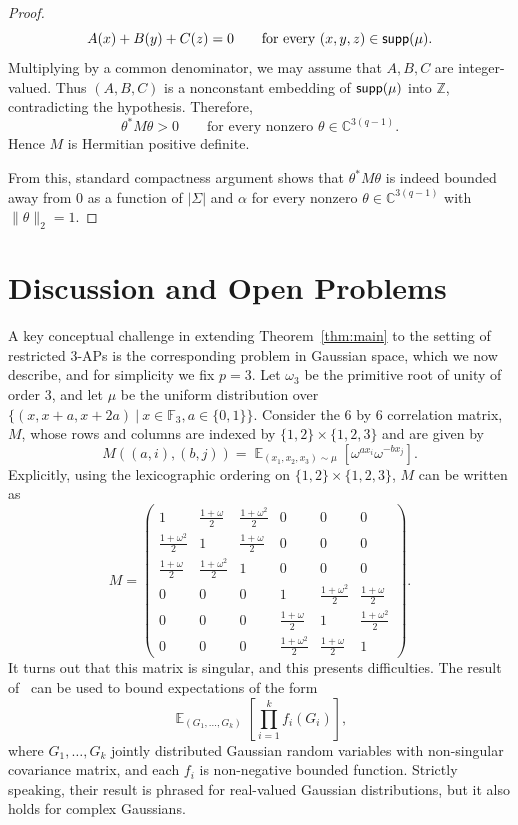 \documentclass[11pt]{article}
\newcommand\norm[1]{\| #1 \|}
\newcommand\Expect[2]{{\mathop{\mathbb{E}}_{#1}\left[ {#2} \right]}}
\begin{document}
\begin{proof}
\[ A(x)+B(y)+C(z)=0 \qquad \text{for every }(x,y,z)\in {\sf supp}(\mu). \]
Multiplying by a common denominator, we may assume that $A,B,C$ are integer-valued. Thus $(A, B, C)$ is a nonconstant embedding of ${\sf supp}(\mu)$ into $\mathbb{Z}$, contradicting the hypothesis. Therefore, \[ \theta^*M\theta>0 \qquad \text{for every nonzero } \theta\in\mathbb{C}^{3(q-1)}. \] Hence $M$ is Hermitian positive definite.

From this, standard compactness argument shows that $\theta^*M\theta$ is indeed bounded away from $0$ as a function of $|\Sigma|$ and $\alpha$ for every nonzero $\theta\in\mathbb{C}^{3(q-1)}$ with $\norm{\theta}_2 = 1$.
\end{proof}



\section{Discussion and Open Problems}\label{sec:discussion}
A key conceptual challenge in extending Theorem~\ref{thm:main} to the setting of restricted $3$-APs is the corresponding problem in Gaussian space, which we now describe, and for simplicity we fix $p=3$. 
Let $\omega_3$ be the primitive root of unity of order $3$, and let $\mu$ be the uniform distribution over $\{(x,x+a,x+2a)~|~x\in\mathbb{F}_3, a\in\{0,1\}\}$. Consider the $6$ by $6$ correlation matrix, $M$, whose rows and columns are indexed by $\{1,2\}\times\{1,2,3\}$ and are given by
\[
M((a,i),(b,j))
=\Expect{(x_1,x_2,x_3)\sim\mu}{\omega^{a x_i}\omega^{-b x_j}}.
\]
Explicitly, using the lexicographic ordering on $\{1,2\}\times\{1,2,3\}$, $M$ can be written as
\begin{equation}\label{matrix:M}
M = \begin{pmatrix}
1 & \frac{1+\omega}{2} & \frac{1+\omega^2}{2} & 0 & 0 & 0 \\
\frac{1+\omega^2}{2} & 1 & \frac{1+\omega}{2} & 0 & 0 & 0 \\
\frac{1+\omega}{2} & \frac{1+\omega^2}{2} & 1 & 0 & 0 & 0 \\
0 & 0 & 0 & 1 & \frac{1+\omega^2}{2} & \frac{1+\omega}{2} \\
0 & 0 & 0 & \frac{1+\omega}{2} & 1 & \frac{1+\omega^2}{2} \\
0 & 0 & 0 & \frac{1+\omega^2}{2} & \frac{1+\omega}{2} & 1
\end{pmatrix}.
\end{equation}
It turns out that this matrix is singular, and this presents difficulties. The result of~\cite{ChenDafnisPaouris2015HolderGaussian} can be used to bound expectations of the form
\[
\Expect{(G_1,\ldots,G_k)}{\prod\limits_{i=1}^{k}f_i(G_i)},
\]
where $G_1,\ldots,G_k$ jointly distributed Gaussian random variables with non-singular covariance matrix, and each $f_i$ is non-negative bounded function. Strictly speaking, their result is phrased for real-valued Gaussian distributions, but it also holds for complex Gaussians. 
\end{document}
